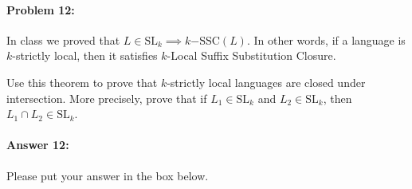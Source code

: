 \documentclass[10pt]{article}
\newenvironment{AnswerBox}{\begin{mdframed}[style=simple]}{\end{mdframed}}
\begin{document}
\begin{AnswerBox}%

    
\end{AnswerBox}%


\hrulefill %

\paragraph{Problem 12:}

In class we proved that
$L \in \mathrm{SL}_k \implies k\mathrm{-SSC}(L)$. In other words, if a
language is $k$-strictly local, then it satisfies $k$-Local Suffix Substitution
Closure.

Use this theorem to prove that $k$-strictly local languages
are closed under intersection. More precisely, prove that if
$L_1 \in \mathrm{SL}_k$ and $L_2 \in \mathrm{SL}_k$, then
$L_1 \cap L_2 \in \mathrm{SL}_k$.

\paragraph{Answer 12:}  Please put your answer in the box below.


\begin{AnswerBox}%

    
\end{AnswerBox}%
\end{document}
